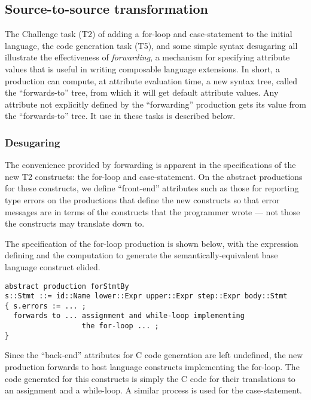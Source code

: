 \subsection{Source-to-source transformation}
\label{silver:sec:transformation}


The Challenge task (T2) of adding a for-loop and case-statement to the
initial language, the code generation task (T5), and some simple
syntax desugaring all illustrate the effectiveness of
\emph{forwarding}, a mechanism for specifying attribute values that is
useful in writing composable language extensions.
%
In short, a production can compute, at attribute evaluation time, a
new syntax tree, called the ``forwards-to'' tree, from which it will
get default attribute values.  Any attribute not explicitly defined by
the ``forwarding'' production gets its value from the ``forwards-to''
tree.  It use in these tasks is described below.

\subsubsection{Desugaring}

The convenience provided by forwarding is apparent in the
specifications of the new T2 constructs: the for-loop and
case-statement.
%
On the
abstract productions for these constructs, we define
``front-end'' attributes such as those for reporting type errors on
the productions that define the new constructs so that error messages
are in terms of the constructs that the programmer wrote --- not those
the constructs may translate down to. 

The specification of the for-loop production  is shown
below, with the expression defining  and the computation to
generate the semantically-equivalent base language construct elided.
\begin{verbatim}
abstract production forStmtBy
s::Stmt ::= id::Name lower::Expr upper::Expr step::Expr body::Stmt
{ s.errors := ... ;
  forwards to ... assignment and while-loop implementing
                  the for-loop ... ;
}
\end{verbatim}
Since the ``back-end'' attributes for C code generation are left
undefined, the new production forwards to host language constructs
implementing the for-loop.  The code generated for this constructs is
simply the C code for their translations to an assignment and a
while-loop.  A similar process is used for the case-statement.




